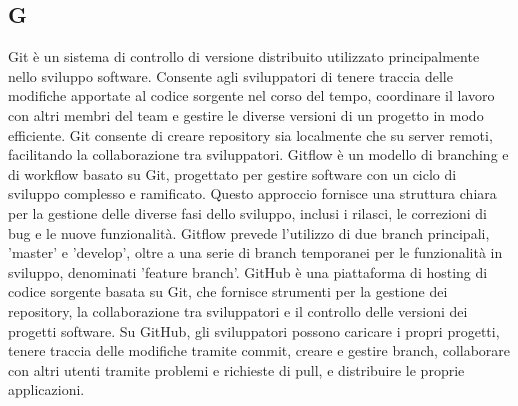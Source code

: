\begin{center}
\section*{G}
\end{center}
Git è un sistema di controllo di versione distribuito utilizzato principalmente nello sviluppo software. Consente agli sviluppatori di tenere traccia delle modifiche apportate al codice sorgente nel corso del tempo, coordinare il lavoro con altri membri del team e gestire le diverse versioni di un progetto in modo efficiente. Git consente di creare repository sia localmente che su server remoti, facilitando la collaborazione tra sviluppatori.
Gitflow è un modello di branching e di workflow basato su Git, progettato per gestire software con un ciclo di sviluppo complesso e ramificato. Questo approccio fornisce una struttura chiara per la gestione delle diverse fasi dello sviluppo, inclusi i rilasci, le correzioni di bug e le nuove funzionalità. Gitflow prevede l'utilizzo di due branch principali, 'master' e 'develop', oltre a una serie di branch temporanei per le funzionalità in sviluppo, denominati 'feature branch'.
GitHub è una piattaforma di hosting di codice sorgente basata su Git, che fornisce strumenti per la gestione dei repository, la collaborazione tra sviluppatori e il controllo delle versioni dei progetti software. Su GitHub, gli sviluppatori possono caricare i propri progetti, tenere traccia delle modifiche tramite commit, creare e gestire branch, collaborare con altri utenti tramite problemi e richieste di pull, e distribuire le proprie applicazioni.
